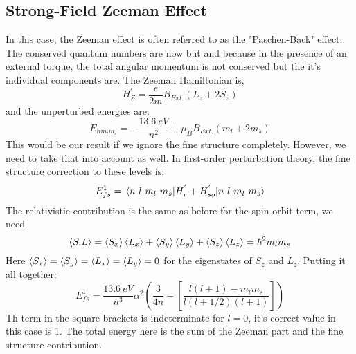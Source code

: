 \subsection{Strong-Field Zeeman Effect}
In this case, the Zeeman effect is often referred to as the "Paschen-Back" effect. The conserved quantum numbers are now but and because in the presence of an external torque, the total angular momentum is not conserved but the it's individual components are. The Zeeman Hamiltonian is,
\begin{equation}
H^{'}_{Z} =  \frac{e}{2m} B_{Ext.} (L_{z} + 2 S_{z})
\end{equation}
and the unperturbed energies are:
\begin{equation}
E_{nm_{l}m_{s}} = -\frac{13.6 \ eV}{n^{2}} + \mu_{B}B_{Ext.}(m_{l} + 2 m_{s})
\end{equation}
This would be our result if we ignore the fine structure completely. However, we need to take that into account as well. In first-order perturbation theory, the fine structure correction to these levels is:
\begin{equation}
E^{1}_{fs} = \expval{H^{'}_{r} + H^{'}_{so}}{n \ l \ m_{l} \ m_{s}}
\end{equation}
The relativistic contribution is the same as before for the spin-orbit term, we need
\begin{equation}
\expval{S.L} = \expval{S_{x}}\expval{L_{x}} + \expval{S_{y}}\expval{L_{y}} + \expval{S_{z}}\expval{L_{z}} = \hbar^{2}m_{l}m_{s}
\end{equation}
Here $\expval{S_{x}} = \expval{S_{y}} = \expval{L_{x}} = \expval{L_{y}} = 0$ for the eigenstates of $S_{z}$ and $L_{z}$. Putting it all together:
\begin{equation}
E^{1}_{fs} = \frac{13.6 \ eV}{n^{3}}\alpha^{2} \left(\frac{3}{4n} - \left[ \frac{l(l+1)-m_{l}m_{s}}{l(l+1/2)(l+1)}\right]\right)
\end{equation}
Th term in the square brackets is indeterminate for $l=0$, it's correct value in this case is 1. The total energy here is the sum of the Zeeman part and the fine structure contribution.
